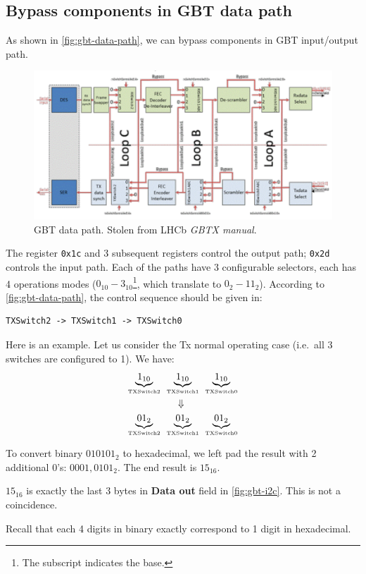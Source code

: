 \subsection{Bypass components in GBT data path}
As shown in \autoref{fig:gbt-data-path}, we can bypass components in GBT
input/output path.

\begin{figure}[ht]
    \centering
    \includegraphics[width=\textwidth]{res/gbtx_data_path_block_diagram.pdf}
    \caption{GBT data path. Stolen from LHCb \emph{GBTX manual}.}
    \label{fig:gbt-data-path}
\end{figure}

The register \texttt{0x1c} and 3 subsequent registers control the output path;
\texttt{0x2d} controls the input path.
Each of the paths have 3 configurable selectors, each has 4 operations modes
($0_{10} - 3_{10}$\footnote{The subscript indicates the base.},
which translate to $0_2 - 11_2$). According to \autoref{fig:gbt-data-path}, the
control sequence should be given in:

\begin{verbatim}
TXSwitch2 -> TXSwitch1 -> TXSwitch0
\end{verbatim}

Here is an example.
Let us consider the Tx normal operating case (i.e.\ all 3 switches are
configured to 1). We have:
\begin{align*}
    \underbrace{1_{10}}_{\text{\tiny ~TXSwitch2~}}
    &\underbrace{1_{10}}_{\text{\tiny ~TXSwitch1~}}
    \underbrace{1_{10}}_{\text{\tiny ~TXSwitch0~}} \\
    &\symbolwithin{\Downarrow}{\text{\tiny ~TXSwitch0~}} \\
    \underbrace{01_{2}}_{\text{\tiny ~TXSwitch2~}}
    &\underbrace{01_{2}}_{\text{\tiny ~TXSwitch1~}}
    \underbrace{01_{2}}_{\text{\tiny ~TXSwitch0~}} \\
\end{align*}

To convert binary $010101_2$ to hexadecimal, we left pad the result with 2
additional 0's: $0001,0101_2$. The end result is $15_{16}$.

\begin{leftbar}
    $15_{16}$ is exactly the last 3 bytes in \textbf{Data out} field in
    \autoref{fig:gbt-i2c}.
    This is not a coincidence.
\end{leftbar}

\begin{leftbar}
    Recall that each 4 digits in binary exactly correspond to 1 digit in
    hexadecimal.
\end{leftbar}
